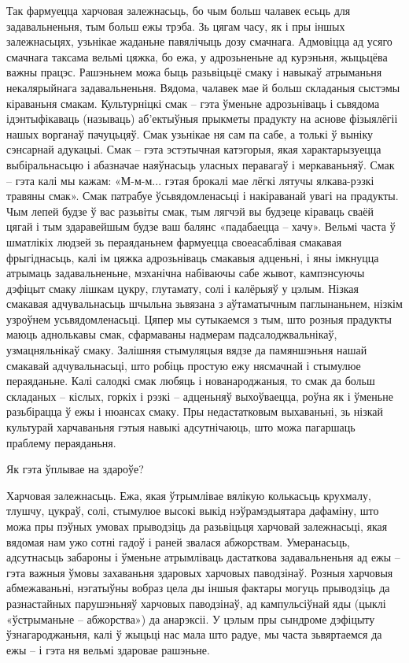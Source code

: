 Так фармуецца харчовая залежнасьць, бо чым больш чалавек есьць для задавальненьня, тым больш ежы трэба. Зь цягам часу, як і пры іншых залежнасьцях, узьнікае жаданьне павялічыць дозу смачнага. Адмовіцца ад усяго смачнага таксама вельмі цяжка, бо ежа, у адрозьненьне ад курэньня, жыцьцёва важны працэс. Рашэньнем можа быць разьвіцьцё смаку і навыкаў атрыманьня некалярыйнага задавальненьня.
Вядома, чалавек мае й больш складаныя сыстэмы кіраваньня смакам. Культурніцкі смак – гэта ўменьне адрозьніваць і сьвядома ідэнтыфікаваць (называць) аб'ектыўныя прыкметы прадукту на аснове фізыялёгіі нашых ворганаў пачуцьцяў. Смак узьнікае ня сам па сабе, а толькі ў выніку сэнсарнай адукацыі. Смак – гэта эстэтычная катэгорыя, якая характарызуецца выбіральнасьцю і абазначае наяўнасьць уласных перавагаў і меркаваньняў. Смак – гэта калі мы кажам: «М-м-м... гэтая брокалі мае лёгкі лятучы ялкава-рэзкі травяны смак». Смак патрабуе ўсьвядомленасьці і накіраванай увагі на прадукты. Чым лепей будзе ў вас разьвіты смак, тым лягчэй вы будзеце кіраваць сваёй цягай і тым здаравейшым будзе ваш балянс «падабаецца – хачу».
Вельмі часта ў шматлікіх людзей зь пераяданьнем фармуецца своеасаблівая смакавая фрыгіднасьць, калі ім цяжка адрозьніваць смакавыя адценьні, і яны імкнуцца атрымаць задавальненьне, мэханічна набіваючы сабе жывот, кампэнсуючы дэфіцыт смаку лішкам цукру, глутамату, солі і калёрыяў у цэлым. Нізкая смакавая адчувальнасьць шчыльна зьвязана з аўтаматычным паглынаньнем, нізкім узроўнем усьвядомленасьці. Цяпер мы сутыкаемся з тым, што розныя прадукты маюць аднолькавы смак, сфармаваны надмерам падсалоджвальнікаў, узмацняльнікаў смаку. Залішняя стымуляцыя вядзе да памяншэньня нашай смакавай адчувальнасьці, што робіць простую ежу нясмачнай і стымулюе пераяданьне. Калі салодкі смак любяць і нованароджаныя, то смак да больш складаных – кіслых, горкіх і рэзкі – адценьняў выхоўваецца, роўна як і ўменьне разьбірацца ў ежы і нюансах смаку. Пры недастатковым выхаваньні, зь нізкай культурай харчаваньня гэтыя навыкі адсутнічаюць, што можа пагаршаць праблему пераяданьня.

Як гэта ўплывае на здароўе?

Харчовая залежнасьць.
Ежа, якая ўтрымлівае вялікую колькасьць крухмалу, тлушчу, цукраў, солі, стымулюе высокі выкід нэўрамэдыятара дафаміну, што можа пры пэўных умовах прыводзіць да разьвіцьця харчовай залежнасьці, якая вядомая нам ужо сотні гадоў і раней звалася абжорствам. Умеранасьць, адсутнасьць забароны і ўменьне атрымліваць дастаткова задавальненьня ад ежы – гэта важныя ўмовы захаваньня здаровых харчовых паводзінаў. Розныя харчовыя абмежаваньні, нэгатыўны вобраз цела ды іншыя фактары могуць прыводзіць да разнастайных парушэньняў харчовых паводзінаў, ад кампульсіўнай яды (цыклі «ўстрыманьне – абжорства») да анарэксіі. У цэлым пры сындроме дэфіцыту ўзнагароджаньня, калі ў жыцьці нас мала што радуе, мы часта зьвяртаемся да ежы – і гэта ня вельмі здаровае рашэньне.

